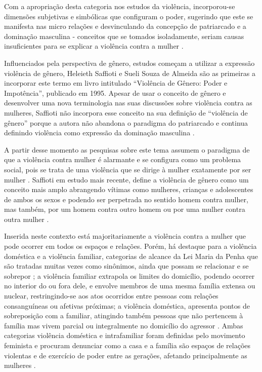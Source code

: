 \documentclass[12pt]{article}
\begin{document}
Com a apropriação desta  categoria nos estudos da violência, incorporou-se dimensões subjetivas e simbólicas que configuram o poder, sugerindo que este se manifesta nas micro relações e desvinculando da concepção de patriarcado e a dominação masculina - conceitos que  se tomados isoladamente, seriam causas insuficientes para se explicar a violência contra a mulher \cite{SAFFIOTI1992}. 

Influenciados pela perspectiva de gênero, estudos começam a utilizar a expressão violência de gênero, Heleieth Saffioti e Sueli Souza de Almeida são as primeiras a incorporar este termo em livro intitulado ``Violência de Gênero: Poder e Impotência'', publicado em 1995. Apesar de usar o conceito de gênero e desenvolver uma nova terminologia nas suas discussões sobre violência contra as mulheres, Saffioti não incorpora esse conceito na sua definição de ``violência de gênero'' porque a autora não abandona o paradigma do patriarcado e continua definindo violência como expressão da dominação masculina \cite{santos2005}.

A partir desse momento as pesquisas sobre este tema assumem o paradigma de que a violência contra mulher é alarmante e se configura como um problema social, pois se trata de uma violência que se dirige à mulher exatamente por ser mulher \cite{stuker2016}. Saffioti em estudo mais recente, define a violência de gênero como um conceito mais amplo  abrangendo vítimas como mulheres, crianças e adolescentes de ambos os sexos e podendo ser perpetrada no sentido homem contra mulher, mas também, por um homem contra outro homem ou por uma mulher contra outra mulher \cite{Saffioti2004}. 

Inserida neste contexto está majoritariamente a violência contra a mulher que pode ocorrer em todos os espaços e relações. Porém, há destaque para a violência doméstica e a violência familiar, categorias de alcance da Lei Maria da Penha que são tratadas muitas vezes como sinônimos, ainda que possam se relacionar e se sobrepor \cite{stuker2016}; a violência familiar extrapola os limites do domicílio, podendo ocorrer no interior do ou fora dele, e envolve membros de uma mesma família extensa ou nuclear, restringindo-se aos atos ocorridos entre pessoas com relações consanguíneas ou afetivas próximas; a violência doméstica, apresenta pontos de sobreposição com a familiar, atingindo também pessoas que não pertencem à família mas vivem parcial ou integralmente no domicílio do agressor \cite{Saffioti2004}. Ambas categorias violência doméstica e intrafamiliar foram definidas pelo movimento feminista e procuram denunciar como a casa e a família são espaços de relações violentas e de exercício de poder entre as gerações, afetando principalmente as mulheres \cite{Izumino2003}.
\end{document}
